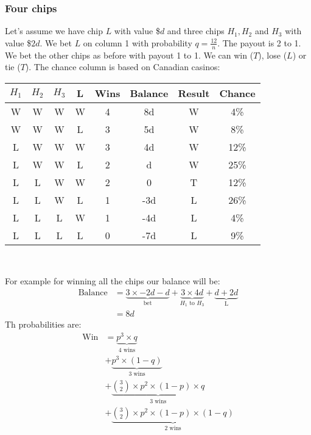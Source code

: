 \documentclass{book}
\begin{document}
	\subsubsection{Four chips}
	Let's assume we have chip $L$ with value \$$d$ and three chips $H_1, H_2$ and $H_3$ with value \$$2d$. We bet $L$ on column 1 with probability $q = \frac{12}{n}$. The payout is 2 to 1. We bet the other chips as before with payout 1 to 1. We can win ($T$), lose ($L$) or tie ($T$). The chance column is based on Canadian casinos: \\
	\par
	\begin{tabular}[h!]{c c c c c c c c}
		\toprule
		$H_1$ & $H_2$ & $H_3$ & L & Wins & Balance & Result & Chance \\
		\midrule
		W & W & W & W & 4 & 8d & W & 4\% \\
		W & W & W & L & 3 & 5d & W & 8\% \\
		L & W & W & W & 3 & 4d & W & 12\% \\
		L & W & W & L & 2 & d & W & 25\% \\
		L & L & W & W & 2 & 0 & T & 12\% \\
		L & L & W & L & 1 & -3d & L & 26\% \\
		L & L & L & W & 1 & -4d & L & 4\% \\
		L & L & L & L & 0 & -7d & L & 9\% \\
		\bottomrule
	\end{tabular} \\	
	\par
	For example for winning all the chips our balance will be:
	\begin{equation*}
		\begin{split}
			\text{Balance} &= \underbrace{3 \times -2d - d}_\text{bet} + \underbrace{3 \times 4d}_\text{$H_1$ to $H_3$} + \underbrace{d + 2d}_\text{L} \\
			&= 8d
		\end{split}
	\end{equation*}
	Th probabilities are:
	\begin{equation*}
		\begin{split}
			\text{Win} &= \underbrace{p^3 \times q}_{\text{4 wins}} \\
			&+ \underbrace{p^3 \times (1 - q)}_\text{3 wins} \\
			&+ \underbrace{\binom{3}{2} \times p^2 \times (1 - p) \times q}_\text{3 wins} \\
			&+ \underbrace{\binom{3}{2} \times p^2 \times (1 - p) \times (1 - q)}_\text{2 wins} \\
		\end{split}
	\end{equation*}
\end{document}
